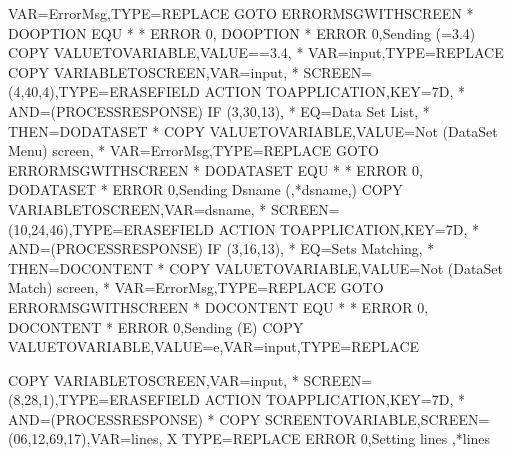 \documentclass[letterpaper,10pt,english]{sphinxmanual}
\begin{document}
\begin{sphinxVerbatim}[commandchars=\\\{\}]
         VAR=ErrorMsg,TYPE=REPLACE
   GOTO\PYGZdl{} ERRORMSG\PYGZus{}WITH\PYGZus{}SCREEN
*
DOOPTION EQU *
*
   ERROR\PYGZdl{} 0,\PYGZsq{}\PYGZhy{}\PYGZhy{}\PYGZhy{} DOOPTION\PYGZsq{}
*
   ERROR\PYGZdl{} 0,\PYGZsq{}Sending (=3.4)\PYGZsq{}
   COPY\PYGZdl{} VALUE\PYGZhy{}TO\PYGZhy{}VARIABLE,VALUE=\PYGZsq{}=3.4\PYGZsq{},                         *
         VAR=\PYGZsq{}input\PYGZsq{},TYPE=REPLACE
   COPY\PYGZdl{} VARIABLE\PYGZhy{}TO\PYGZhy{}SCREEN,VAR=\PYGZsq{}input\PYGZsq{},                         *
         SCREEN=(4,40,4),TYPE=ERASE\PYGZhy{}FIELD
   ACTION\PYGZdl{} TO\PYGZhy{}APPLICATION,KEY=7D,                                *
         AND=(PROCESS\PYGZhy{}RESPONSE)
   IF\PYGZdl{} (3,30,13),                                                *
         EQ=\PYGZsq{}Data Set List\PYGZsq{},                                     *
         THEN=DODATASET
*
   COPY\PYGZdl{} VALUE\PYGZhy{}TO\PYGZhy{}VARIABLE,VALUE=\PYGZsq{}Not (DataSet Menu) screen\PYGZsq{},    *
         VAR=ErrorMsg,TYPE=REPLACE
   GOTO\PYGZdl{} ERRORMSG\PYGZus{}WITH\PYGZus{}SCREEN
*
DODATASET EQU *
*
   ERROR\PYGZdl{} 0,\PYGZsq{}\PYGZhy{}\PYGZhy{}\PYGZhy{} DODATASET\PYGZsq{}
*
   ERROR\PYGZdl{} 0,\PYGZsq{}Sending Dsname (\PYGZsq{},\PYGZsq{}*dsname\PYGZsq{},\PYGZsq{})\PYGZsq{}
   COPY\PYGZdl{} VARIABLE\PYGZhy{}TO\PYGZhy{}SCREEN,VAR=\PYGZsq{}dsname\PYGZsq{},                        *
         SCREEN=(10,24,46),TYPE=ERASE\PYGZhy{}FIELD
   ACTION\PYGZdl{} TO\PYGZhy{}APPLICATION,KEY=7D,                                *
         AND=(PROCESS\PYGZhy{}RESPONSE)
   IF\PYGZdl{} (3,16,13),                                                *
         EQ=\PYGZsq{}Sets Matching\PYGZsq{},                                     *
         THEN=DOCONTENT
*
   COPY\PYGZdl{} VALUE\PYGZhy{}TO\PYGZhy{}VARIABLE,VALUE=\PYGZsq{}Not (DataSet Match) screen\PYGZsq{},   *
         VAR=ErrorMsg,TYPE=REPLACE
   GOTO\PYGZdl{} ERRORMSG\PYGZus{}WITH\PYGZus{}SCREEN
*
DOCONTENT EQU *
*
   ERROR\PYGZdl{} 0,\PYGZsq{}\PYGZhy{}\PYGZhy{}\PYGZhy{} DOCONTENT\PYGZsq{}
*
   ERROR\PYGZdl{} 0,\PYGZsq{}Sending (E)\PYGZsq{}
   COPY\PYGZdl{} VALUE\PYGZhy{}TO\PYGZhy{}VARIABLE,VALUE=\PYGZsq{}e\PYGZsq{},VAR=\PYGZsq{}input\PYGZsq{},TYPE=REPLACE

   COPY\PYGZdl{} VARIABLE\PYGZhy{}TO\PYGZhy{}SCREEN,VAR=\PYGZsq{}input\PYGZsq{},                         *
         SCREEN=(8,28,1),TYPE=ERASE\PYGZhy{}FIELD
   ACTION\PYGZdl{} TO\PYGZhy{}APPLICATION,KEY=7D,                                *
         AND=(PROCESS\PYGZhy{}RESPONSE)
*
   COPY\PYGZdl{} SCREEN\PYGZhy{}TO\PYGZhy{}VARIABLE,SCREEN=(06,12,69,17),VAR=\PYGZsq{}lines\PYGZsq{},    X
         TYPE=REPLACE
   ERROR\PYGZdl{} 0,\PYGZsq{}Setting lines \PYGZsq{},\PYGZsq{}*lines\PYGZsq{}



\end{sphinxVerbatim}
\end{document}
